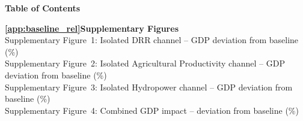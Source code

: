 \documentclass[
  final,
  10pt,
  letterpaper,
  english,
]{article}
\begin{document}
{
  \noindent\textbf{\large Table of Contents}

  \vspace{1em}
  \noindent\textbf{\ref{app:baseline_rel}\enspace Supplementary Figures}\dotfill\pageref{app:baseline_rel}\\[0.3em]
  \hspace*{2em}Supplementary Figure~1: Isolated DRR channel -- GDP deviation from baseline (\%)\dotfill\pageref{fig:results_DRR_baseline}\\[0.15em]
  \hspace*{2em}Supplementary Figure~2: Isolated Agricultural Productivity channel -- GDP deviation from baseline (\%)\dotfill\pageref{fig:results_AGR_baseline}\\[0.15em]
  \hspace*{2em}Supplementary Figure~3: Isolated Hydropower channel -- GDP deviation from baseline (\%)\dotfill\pageref{fig:results_HYD_baseline}\\[0.15em]
  \hspace*{2em}Supplementary Figure~4: Combined GDP impact -- deviation from baseline (\%)\dotfill\pageref{fig:results_All_baseline}\\[1em]

}
\end{document}
